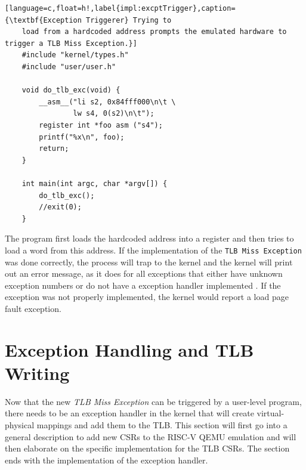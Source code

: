 \begin{lstlisting}[language=c,float=h!,label{impl:excptTrigger},caption={\textbf{Exception Triggerer} Trying to
    load from a hardcoded address prompts the emulated hardware to trigger a TLB Miss Exception.}]
    #include "kernel/types.h"
    #include "user/user.h"

    void do_tlb_exc(void) {
        __asm__("li s2, 0x84fff000\n\t \
                lw s4, 0(s2)\n\t");
        register int *foo asm ("s4");
        printf("%x\n", foo);
        return;
    }

    int main(int argc, char *argv[]) {
        do_tlb_exc();
        //exit(0);
    }
\end{lstlisting}
The program first loads the hardcoded address into a register and then tries to load a word from this address.
If the implementation of the \texttt{TLB Miss Exception} was done correctly, the process will trap to the kernel
and the kernel will print out an error message, as it does for all exceptions that either have unknown exception
numbers or do not have a exception handler implemented \cite{cox2011xv6}.
If the exception was not properly implemented, the kernel would report a load page fault exception.




\section{Exception Handling and TLB Writing}
\label{sect:tlbwrite}

Now that the new \textit{TLB Miss Exception} can be triggered by a user-level program, there needs
to be an exception handler in the kernel that will create virtual-physical mappings and add them to the
TLB.
This section will first go into a general description to add new CSRs to the RISC-V QEMU emulation and
will then elaborate on the specific implementation for the TLB CSRs.
The section ends with the implementation of the exception handler.


